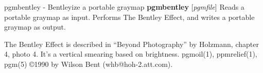 %

\newpage
%

pgmbentley - Bentleyize a portable graymap
{\bf pgmbentley}
{\rm [}{\it pgmfile}{\rm ]}
Reads a portable graymap as input.
Performs The Bentley Effect, and writes a portable graymap as output.
\par
The Bentley Effect is described in ``Beyond Photography'' by Holzmann,
chapter 4, photo 4.
It's a vertical smearing based on brightness.
pgmoil(1), ppmrelief(1), pgm(5)
\copyright 1990 by Wilson Bent (whb@hoh-2.att.com).
%
 
%

\newpage
%

